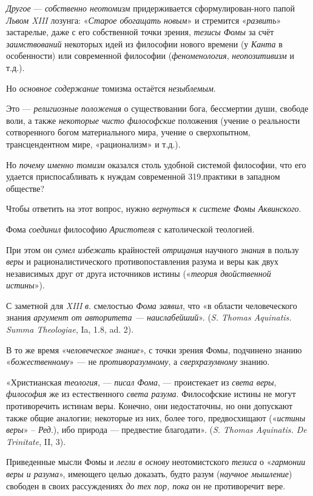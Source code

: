 \documentclass[a4paper,14pt,russian]{extreport}
\begin{document}
\emph{Другое} --- \emph{собственно неотомизм} придерживается сформулирован-ного папой \emph{Львом XIII} лозунга: «\emph{Старое обогащать новым}» и стремится «\emph{развить}» застарелые, даже с его собственной точки зрения, \emph{тезисы Фомы} за счёт \emph{заимствований} некоторых идей из философии нового времени (у \emph{Канта} в особенности) или современной философии (\emph{феноменология}, \emph{неопозитивизм} и т.д.).

Но \emph{основное содержание} томизма остаётся \emph{незыблемым}.

Это --- \emph{религиозные положения} о существовании бога, бессмертии души, свободе воли, а также \emph{некоторые чисто философские} положения (учение о реальности сотворенного богом материального мира, учение о сверхопытном, трансцендентном мире, «рационализм» и т.д.).

Но \emph{почему именно томизм} оказался столь удобной системой философии, что его удается приспосабливать к нуждам современной 319.практики в западном обществе?

Чтобы ответить на этот вопрос, нужно \emph{вернуться к системе Фомы Аквинского}.

Фома \emph{соединил} философию \emph{Аристотеля} с католической теологией.

При этом он \emph{сумел избежать} крайностей \emph{отрицания} научного \emph{знания} в пользу \emph{веры} и рационалистического противопоставления разума и веры как двух независимых друг от друга источников истины («\emph{теория двойственной истины}»).

С заметной для \emph{XIII} \emph{в}. смелостью \emph{Фома заявил}, что «в области человеческого знания \emph{аргумент от авторитета --- наислабейший}». (\emph{S. Thomas Aquinatis. Summa Theologiae}, Ia, 1.8, ad. 2).

В то же время «\emph{человеческое знание}», с точки зрения Фомы, подчинено знанию «\emph{божественному}» --- не \emph{противоразумному}, а \emph{сверхразумному} знанию.

«Христианская \emph{теология}, --- \emph{писал Фома}, --- проистекает из \emph{света веры}, \emph{философия} же из естественного \emph{света разума}. Философские истины не могут противоречить истинам веры. Конечно, они недостаточны, но они допускают также общие аналогии; некоторые из них, более того, предвосхищают («\emph{истины веры}» -- \emph{Ред}.), ибо природа --- предвестие благодати». (\emph{S. Thomas Aquinatis. De Trinitate}, II, 3).

Приведенные мысли Фомы и \emph{легли в основу} неотомистского \emph{тезиса} о «\emph{гармонии веры и разума}», имеющего целью доказать, будто разум (\emph{научное мышление}) свободен в своих рассуждениях \emph{до тех пор, пока} он не противоречит вере.
\end{document}
